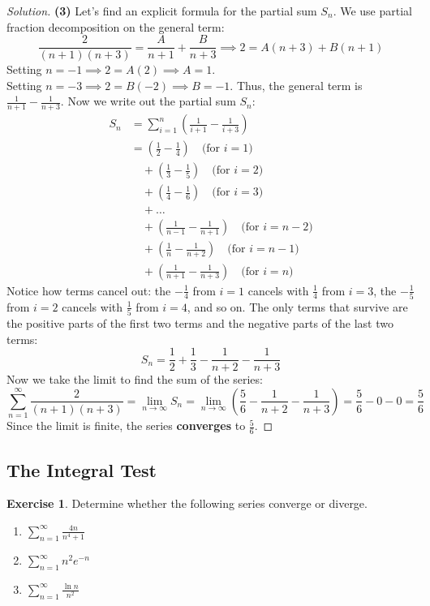 \documentclass[11pt]{article}
\theoremstyle{definition}
\newtheorem{exercise}{Exercise}[section]
\newenvironment{solution}{\begin{proof}[Solution]}{\end{proof}}
\begin{document}
\begin{solution}
\textbf{(3)} Let's find an explicit formula for the partial sum $S_n$. We use partial fraction decomposition on the general term:
\[
\frac{2}{(n+1)(n+3)} = \frac{A}{n+1} + \frac{B}{n+3} \implies 2 = A(n+3) + B(n+1)
\]
Setting $n = -1 \implies 2 = A(2) \implies A = 1$. \\
Setting $n = -3 \implies 2 = B(-2) \implies B = -1$.
Thus, the general term is $\frac{1}{n+1} - \frac{1}{n+3}$.
Now we write out the partial sum $S_n$:
\begin{align*}
S_n &= \sum_{i=1}^{n} \left( \frac{1}{i+1} - \frac{1}{i+3} \right) \\
&= \left( \frac{1}{2} - \frac{1}{4} \right) \quad \text{(for } i=1) \\
&\quad + \left( \frac{1}{3} - \frac{1}{5} \right) \quad \text{(for } i=2) \\
&\quad + \left( \frac{1}{4} - \frac{1}{6} \right) \quad \text{(for } i=3) \\
&\quad + \dots \\
&\quad + \left( \frac{1}{n-1} - \frac{1}{n+1} \right) \quad \text{(for } i=n-2) \\
&\quad + \left( \frac{1}{n} - \frac{1}{n+2} \right) \quad \text{(for } i=n-1) \\
&\quad + \left( \frac{1}{n+1} - \frac{1}{n+3} \right) \quad \text{(for } i=n)
\end{align*}
Notice how terms cancel out: the $-\frac{1}{4}$ from $i=1$ cancels with $\frac{1}{4}$ from $i=3$, the $-\frac{1}{5}$ from $i=2$ cancels with $\frac{1}{5}$ from $i=4$, and so on. 
The only terms that survive are the positive parts of the first two terms and the negative parts of the last two terms:
\[
S_n = \frac{1}{2} + \frac{1}{3} - \frac{1}{n+2} - \frac{1}{n+3}
\]
Now we take the limit to find the sum of the series:
\[
\sum_{n=1}^{\infty} \frac{2}{(n+1)(n+3)} = \lim_{n \to \infty} S_n = \lim_{n \to \infty} \left( \frac{5}{6} - \frac{1}{n+2} - \frac{1}{n+3} \right) = \frac{5}{6} - 0 - 0 = \frac{5}{6}
\]
Since the limit is finite, the series \textbf{converges} to $\frac{5}{6}$.
\end{solution}

\subsection{The Integral Test}

\begin{exercise}
Determine whether the following series converge or diverge.
\begin{enumerate}
    \item $\displaystyle \sum_{n=1}^{\infty} \frac{4n}{n^4+1}$
    \item $\displaystyle \sum_{n=1}^{\infty} n^2 e^{-n}$
    \item $\displaystyle \sum_{n=1}^{\infty} \frac{\ln n}{n^2}$
\end{enumerate}
\end{exercise}
\end{document}
